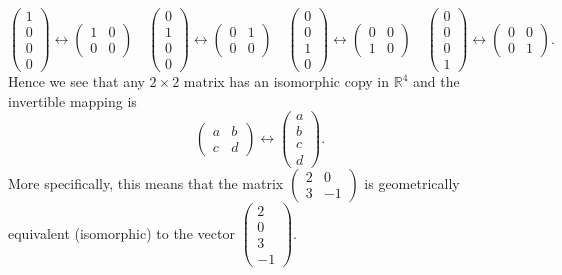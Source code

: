 \[ 
    \begin{pmatrix}1\\0\\0\\0\end{pmatrix} \leftrightarrow
    \begin{pmatrix}1&0\\0&0\end{pmatrix} \quad
    \begin{pmatrix}0\\1\\0\\0\end{pmatrix} \leftrightarrow
    \begin{pmatrix}0&1\\0&0\end{pmatrix} \quad
    \begin{pmatrix}0\\0\\1\\0\end{pmatrix} \leftrightarrow
    \begin{pmatrix}0&0\\1&0\end{pmatrix} \quad
    \begin{pmatrix}0\\0\\0\\1\end{pmatrix} \leftrightarrow
    \begin{pmatrix}0&0\\0&1\end{pmatrix}.
\]
Hence we see that any $2 \times 2$ matrix has an isomorphic copy in $\mathbb{R}^4$ and the
invertible mapping is
\[ \begin{pmatrix} a & b \\ c & d \end{pmatrix} \leftrightarrow \begin{pmatrix}
    a\\b\\c\\d\end{pmatrix}. \]
More specifically, this means that the matrix $\begin{pmatrix} 2&0\\3&-1\end{pmatrix}$ is
geometrically equivalent (isomorphic) to the vector
$\begin{pmatrix}2\\0\\3\\-1\end{pmatrix}$.



